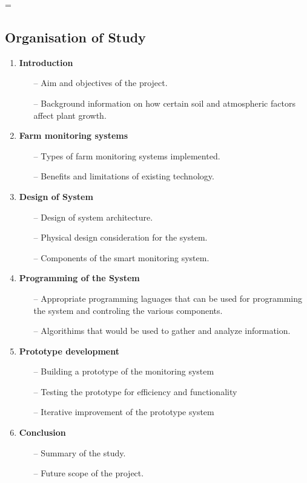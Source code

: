 =\documentclass[12pt, a4paper]{article}
\begin{document}
\subsection{Organisation of Study}
\begin{enumerate}
\item \textbf{Introduction}
	\begin{itemize}
	\item[--] Aim and objectives of the project.
	\item[--] Background information on how certain soil and atmospheric factors affect plant    growth.
	\end{itemize}
\item \textbf{Farm monitoring systems}
\begin{itemize}
    \item[--] Types of farm monitoring systems implemented.
	\item[--] Benefits and limitations of existing technology.
\end{itemize}
\item \textbf{Design of System}
\begin{itemize}
	\item[--] Design of system architecture.
    \item[--] Physical design consideration for the system.
    \item[--] Components of the smart monitoring system.
\end{itemize}
\item \textbf{Programming of the System}
\begin{itemize}
	\item[--] Appropriate programming laguages that can be used for programming the system and controling the various components.
	\item[--] Algorithims that would be used to gather and analyze information.
\end{itemize}
\item \textbf{Prototype development}
\begin{itemize}
\item[--] Building a prototype of the monitoring system
\item[--] Testing the prototype for efficiency and functionality
\item[--] Iterative improvement of the prototype system
\end{itemize}
\item \textbf{Conclusion}
\begin{itemize}
\item[--] Summary of the study.
\item[--] Future scope of the project.
\end{itemize}
\end{enumerate}
\newpage
\end{document}
